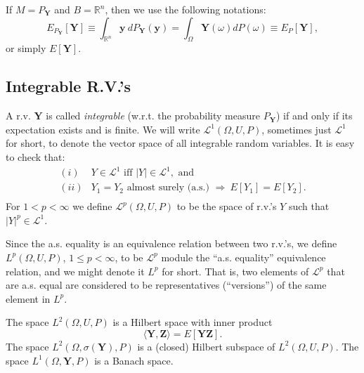 If $M=P_{\mathbf{Y}}$ and $B=\mathbb{R}^n$, then we use the following notations:
\begin{equation*}
E_{P_{\mathbf{Y}}}[\mathbf{Y}] \equiv
\int_{\mathbb{R}^n} \mathbf{y}~dP_\mathbf{Y}(\mathbf{y}) = 
\int_{\Omega}\mathbf{Y}(\omega)dP(\omega) \equiv
E_P[\mathbf{Y}],
\end{equation*}
or simply
$E[\mathbf{Y}]$.

\subsection{Integrable R.V.'s}

A r.v. $\mathbf{Y}$ is called {\it integrable} (w.r.t. the probability measure $P_{\mathbf{Y}}$) if and only if its expectation exists and is finite.
We will write $\mathcal{L}^1(\Omega,U,P)$, sometimes just $\mathcal{L}^1$ for short, to denote the vector space of all integrable random variables.
It is easy to check that:
\[
\begin{array}{rl}
(i)  & Y\in\mathcal{L}^1\mbox{ iff }|Y|\in\mathcal{L}^1,\mbox{ and}   \\
(ii) & Y_1=Y_2\mbox{ almost surely (a.s.) }\Rightarrow~E[Y_1]=E[Y_2]. \\
\end{array}
\]
For $1 < p < \infty$ we define $\mathcal{L}^p(\Omega,U,P)$ to be the space of r.v.'s $Y$ such that $|Y|^p\in\mathcal{L}^1$.

Since the a.s. equality is an equivalence relation between two r.v.'s,
we define $L^p(\Omega,U,P)$, $1\leqslant p < \infty$,
to be $\mathcal{L}^p$ module the ``a.s. equality'' equivalence relation,
and we might denote it $L^p$ for short. That is,
two elements of $\mathcal{L}^p$ that are a.s. equal are considered to be
representatives (``versions'') of the same element in $L^p$.

The space $L^2(\Omega,U,P)$ is a Hilbert space with inner product
\begin{equation*}
\langle \mathbf{Y},\mathbf{Z} \rangle = E[\mathbf{Y}\mathbf{Z}].
\end{equation*}
The space $L^2(\Omega,\sigma(\mathbf{Y}),P)$ is a (closed) Hilbert subspace of $L^2(\Omega,U,P)$.
The space $L^1(\Omega,\mathbf{Y},P)$ is a Banach space.

